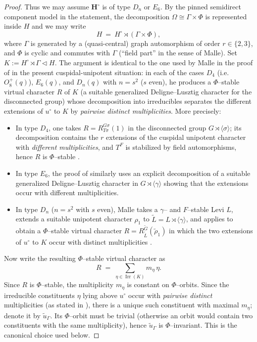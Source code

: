 \documentclass{amsart}
\theoremstyle{plain}
\numberwithin{equation}{section}
\theoremstyle{definition}
\newcommand{\Irr}{\operatorname{Irr}}
\begin{document}
\begin{proof}
Thus we may assume $\mathbf H^\circ$ is of type $D_n$ or $E_6$.
By the pinned semidirect component model in the statement, the decomposition
\(\Omega\cong \Gamma\times\Phi\) is represented inside $H$ and we may write
\[
H \ =\ H^\circ \rtimes (\Gamma\times\Phi),
\]
where $\Gamma$ is generated by a (quasi-central) graph automorphism of order $r\in\{2,3\}$,
and $\Phi$ is cyclic and commutes with $\Gamma$ (``field part'' in the sense of Malle).
Set $K:=H^\circ\rtimes\Gamma\lhd H$.
\smallskip\noindent
The argument is identical to the one used by Malle in the proof of \cite[Prop.~2.3]{Malle08}
in the present cuspidal-unipotent situation: in each of the cases
$D_4$ (i.e.\ $O_8^+(q)$), $E_6(q)$, and $D_n(q)$ with $n=s^2$ ($s$ even),
he produces a $\Phi$--stable virtual character $R$ of $K$ (a suitable generalized
Deligne--Lusztig character for the disconnected group)
whose decomposition into irreducibles separates the different extensions of $u^\circ$
to $K$ by \emph{pairwise distinct multiplicities}. More precisely:
\begin{itemize}
\item In type $D_4$, one takes $R=R^{G\sigma}_{T\sigma}(1)$ in the disconnected group
$G\rtimes\langle\sigma\rangle$; its decomposition contains the $r$ extensions of the cuspidal
unipotent character with \emph{different multiplicities}, and $T^F$ is stabilized by field
automorphisms, hence $R$ is $\Phi$--stable \cite[Prop.~2.3]{Malle08}.
\item In type $E_6$, the proof of \cite[Prop.~2.3]{Malle08} similarly uses an explicit
decomposition of a suitable generalized Deligne--Lusztig character in $G\rtimes\langle\gamma\rangle$
showing that the extensions occur with different multiplicities.
\item In type $D_n$ ($n=s^2$ with $s$ even), Malle takes a $\gamma$-- and $F$--stable Levi $L$,
extends a suitable unipotent character $\rho_1$ to $\widetilde L=L\rtimes\langle\gamma\rangle$,
and applies \cite[Cor.~2.4]{DigneMichel94} to obtain a $\Phi$--stable virtual character
$R=R^{\widetilde G}_{\widetilde L}(\widetilde\rho_1)$ in which the two extensions of $u^\circ$
to $K$ occur with distinct multiplicities \cite[Prop.~2.3]{Malle08}.
\end{itemize}

Now write the resulting $\Phi$--stable virtual character as
\[
R \;=\; \sum_{\eta\in\Irr(K)} m_\eta\,\eta.
\]
Since $R$ is $\Phi$--stable, the multiplicity $m_\eta$ is constant on $\Phi$--orbits.
Since the irreducible constituents $\eta$ lying above $u^\circ$ occur with \emph{pairwise distinct}
multiplicities (as stated in \cite[Prop.~2.3]{Malle08}), there is a unique such constituent with
maximal $m_\eta$; denote it by $\tilde u_\Gamma$.  Its $\Phi$--orbit must be trivial (otherwise an
orbit would contain two constituents with the same multiplicity), hence $\tilde u_\Gamma$ is
$\Phi$--invariant.  This is the canonical choice used below.


\end{proof}
\end{document}
